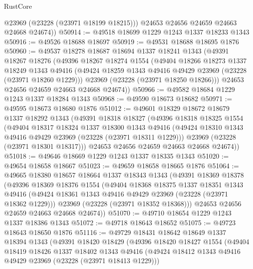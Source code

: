 \begin{lexlean}{RustCore}
\begin{coremodule}
          @23969
          (@23228 (@23971 @18199 @18215)))
        @24653
        @24656
        @24659
        @24663
        @24668
        @24674))
@50914 := @49518 @18699 @1229 @1243 @1337 @18233 @1343
@50916 := @49526 @18688 @18697
@50919 := @49531 @18688 @18695 @1876
@50960 := @49537
    @18278
    @18687
    @18694
    @1337
    @18241
    @1343
    (@49391
      @18267
      @18276
      (@49396
        @18267
        @18274
        @1554
        (@49404
          @18266
          @18273
          @1337
          @18249
          @1343
          @49416
          (@49424 @18259 @1343 @49416 @49429 @23969 (@23228 (@23971 @18260 @1229)))
          @23969
          (@23228 (@23971 @18250 @18266)))
        @24653
        @24656
        @24659
        @24663
        @24668
        @24674))
@50966 := @49582 @18684 @1229 @1243 @1337 @18284 @1343
@50968 := @49590 @18673 @18682
@50971 := @49595 @18673 @18680 @1876
@51012 := @49601
    @18329
    @18672
    @18679
    @1337
    @18292
    @1343
    (@49391
      @18318
      @18327
      (@49396
        @18318
        @18325
        @1554
        (@49404
          @18317
          @18324
          @1337
          @18300
          @1343
          @49416
          (@49424 @18310 @1343 @49416 @49429 @23969 (@23228 (@23971 @18311 @1229)))
          @23969
          (@23228 (@23971 @18301 @18317)))
        @24653
        @24656
        @24659
        @24663
        @24668
        @24674))
@51018 := @49646 @18669 @1229 @1243 @1337 @18335 @1343
@51020 := @49654 @18658 @18667
@51023 := @49659 @18658 @18665 @1876
@51064 := @49665
    @18380
    @18657
    @18664
    @1337
    @18343
    @1343
    (@49391
      @18369
      @18378
      (@49396
        @18369
        @18376
        @1554
        (@49404
          @18368
          @18375
          @1337
          @18351
          @1343
          @49416
          (@49424 @18361 @1343 @49416 @49429 @23969 (@23228 (@23971 @18362 @1229)))
          @23969
          (@23228 (@23971 @18352 @18368)))
        @24653
        @24656
        @24659
        @24663
        @24668
        @24674))
@51070 := @49710 @18654 @1229 @1243 @1337 @18386 @1343
@51072 := @49718 @18643 @18652
@51075 := @49723 @18643 @18650 @1876
@51116 := @49729
    @18431
    @18642
    @18649
    @1337
    @18394
    @1343
    (@49391
      @18420
      @18429
      (@49396
        @18420
        @18427
        @1554
        (@49404
          @18419
          @18426
          @1337
          @18402
          @1343
          @49416
          (@49424 @18412 @1343 @49416 @49429 @23969 (@23228 (@23971 @18413 @1229)))

\end{coremodule}
\end{lexlean}
